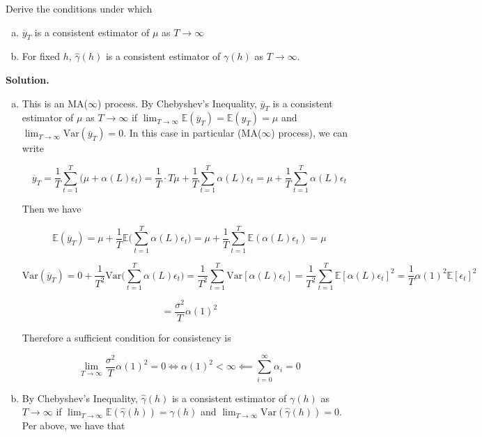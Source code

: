 \documentclass{article}
\newcommand{\E}{\mathbb{E}}
\newcommand{\Var}{\mathrm{Var}}
\begin{document}
Derive the conditions under which

\begin{enumerate}[(a)]

\item \(\overline{y}_T\) is a consistent estimator of \(\mu\) as \(T \to \infty\)

\item For fixed \(h\), \(\hat{\gamma}(h)\) is a consistent estimator of \(\gamma(h)\) as \(T \to \infty\).

\end{enumerate}

\textbf{Solution.}

\begin{enumerate}[(a)]

\item 
This is an MA(\(\infty\)) process. By Chebyshev's Inequality, \(\overline{y}_T\) is a consistent estimator of \(\mu\) as \(T \to \infty\) if \(\lim_{T \to \infty} \E(\overline{y}_T) = \E(y_T) = \mu\) and \(\lim_{T \to \infty} \Var(\overline{y}_T) = 0\). In this case in particular (MA(\(\infty\)) process), we can write

\[
\overline{y}_T = \frac{1}{T} \sum_{t=1}^T \big( \mu + \alpha(L)\epsilon_t \big) = \frac{1}{T}\cdot T \mu + \frac{1}{T} \sum_{t=1}^T \alpha(L)\epsilon_t = \mu + \frac{1}{T}\sum_{t=1}^T \alpha(L)\epsilon_t 
\]

Then we have

\[
\E(\overline{y}_T) = \mu + \frac{1}{T}\E \bigg( \sum_{t=1}^T \alpha(L)\epsilon_t  \bigg)  = \mu + \frac{1}{T} \sum_{t=1}^T  \E ( \alpha(L)\epsilon_t  ) = \mu
\]

\[
\Var(\overline{y}_T) = 0 + \frac{1}{T^2} \Var \bigg( \sum_{t=1}^T \alpha(L)\epsilon_t  \bigg) = \frac{1}{T^2} \sum_{t=1}^T \Var[ \alpha(L)\epsilon_t ] = \frac{1}{T^2} \sum_{t=1}^T \E[ \alpha(L)\epsilon_t ] ^2 = \frac{1}{T} \alpha(1)^2 \E[\epsilon_t ] ^2
\]

\[
= \frac{\sigma^2}{T} \alpha(1)^2
\]

Therefore a sufficient condition for consistency is 

\[
\lim_{T \to \infty}  \frac{\sigma^2}{T} \alpha(1)^2 = 0 \iff \alpha(1)^2 < \infty \impliedby \boxed{\sum_{i=0}^\infty \alpha_i = 0}
\]

\item By Chebyshev's Inequality, \(\hat{\gamma}(h) \) is a consistent estimator of \(\gamma(h)\) as \(T \to \infty\) if \(\lim_{T \to \infty} \E(\hat{\gamma}(h) ) = \gamma(h) \) and \(\lim_{T \to \infty} \Var(\hat{\gamma}(h) ) = 0\).  Per above, we have that


\end{enumerate}
\end{document}
